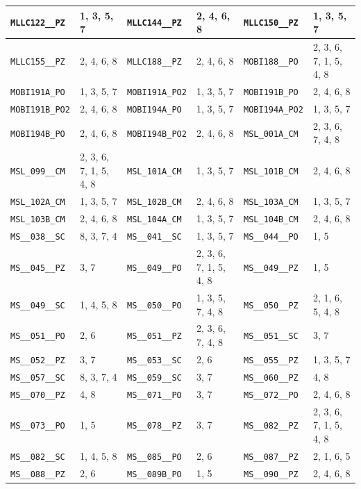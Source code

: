 \begin{longtable}{|l|l||l|l||l|l|}
    \verb|MLLC122__PZ| & 1, 3, 5, 7 & \verb|MLLC144__PZ| & 2, 4, 6, 8 & \verb|MLLC150__PZ| & 1, 3, 5, 7\\\hline
    \verb|MLLC155__PZ| & 2, 4, 6, 8 & \verb|MLLC188__PZ| & 2, 4, 6, 8 & \verb|MOBI188__PO| & 2, 3, 6, 7, 1, 5, 4, 8\\\hline
    \verb|MOBI191A_PO| & 1, 3, 5, 7 & \verb|MOBI191A_PO2| & 1, 3, 5, 7 & \verb|MOBI191B_PO| & 2, 4, 6, 8\\\hline
    \verb|MOBI191B_PO2| & 2, 4, 6, 8 & \verb|MOBI194A_PO| & 1, 3, 5, 7 & \verb|MOBI194A_PO2| & 1, 3, 5, 7\\\hline
    \verb|MOBI194B_PO| & 2, 4, 6, 8 & \verb|MOBI194B_PO2| & 2, 4, 6, 8 & \verb|MSL_001A_CM| & 2, 3, 6, 7, 4, 8\\\hline
    \verb|MSL_099__CM| & 2, 3, 6, 7, 1, 5, 4, 8 & \verb|MSL_101A_CM| & 1, 3, 5, 7 & \verb|MSL_101B_CM| & 2, 4, 6, 8\\\hline
    \verb|MSL_102A_CM| & 1, 3, 5, 7 & \verb|MSL_102B_CM| & 2, 4, 6, 8 & \verb|MSL_103A_CM| & 1, 3, 5, 7\\\hline
    \verb|MSL_103B_CM| & 2, 4, 6, 8 & \verb|MSL_104A_CM| & 1, 3, 5, 7 & \verb|MSL_104B_CM| & 2, 4, 6, 8\\\hline
    \verb|MS__038__SC| & 8, 3, 7, 4 & \verb|MS__041__SC| & 1, 3, 5, 7 & \verb|MS__044__PO| & 1, 5\\\hline
    \verb|MS__045__PZ| & 3, 7 & \verb|MS__049__PO| & 2, 3, 6, 7, 1, 5, 4, 8 & \verb|MS__049__PZ| & 1, 5\\\hline
    \verb|MS__049__SC| & 1, 4, 5, 8 & \verb|MS__050__PO| & 1, 3, 5, 7, 4, 8 & \verb|MS__050__PZ| & 2, 1, 6, 5, 4, 8\\\hline
    \verb|MS__051__PO| & 2, 6 & \verb|MS__051__PZ| & 2, 3, 6, 7, 4, 8 & \verb|MS__051__SC| & 3, 7\\\hline
    \verb|MS__052__PZ| & 3, 7 & \verb|MS__053__SC| & 2, 6 & \verb|MS__055__PZ| & 1, 3, 5, 7\\\hline
    \verb|MS__057__SC| & 8, 3, 7, 4 & \verb|MS__059__SC| & 3, 7 & \verb|MS__060__PZ| & 4, 8\\\hline
    \verb|MS__070__PZ| & 4, 8 & \verb|MS__071__PO| & 3, 7 & \verb|MS__072__PO| & 2, 4, 6, 8\\\hline
    \verb|MS__073__PO| & 1, 5 & \verb|MS__078__PZ| & 3, 7 & \verb|MS__082__PZ| & 2, 3, 6, 7, 1, 5, 4, 8\\\hline
    \verb|MS__082__SC| & 1, 4, 5, 8 & \verb|MS__085__PO| & 2, 6 & \verb|MS__087__PZ| & 2, 1, 6, 5\\\hline
    \verb|MS__088__PZ| & 2, 6 & \verb|MS__089B_PO| & 1, 5 & \verb|MS__090__PZ| & 2, 4, 6, 8\\\hline

\end{longtable}
